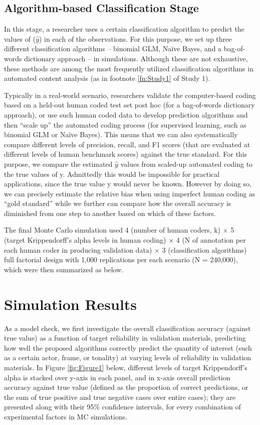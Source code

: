 \documentclass[man, 12pt, a4paper, nolmodern, noextraspace]{apa6}
\begin{document}
    \subsection{Algorithm-based Classification Stage}
    
    In this stage, a researcher uses a certain classification algorithm to predict the values of ($\hat{y}$) in each of the observations. For this purpose, we set up three different classification algorithms – binomial GLM, Naïve Bayes, and a bag-of-words dictionary approach -- in simulations. Although these are not exhaustive, these methods are among the most frequently utilized classification algorithms in automated content analysis (as in footnote \ref{fn:Study1} of Study 1). 
    
    Typically in a real-world scenario, researchers validate the computer-based coding based on a held-out human coded test set post hoc (for a bag-of-words dictionary approach), or use such human coded data to develop prediction algorithms and then ``scale up'' the automated coding process (for supervised learning, such as binomial GLM or Naïve Bayes). This means that we can also systematically compare different levels of precision, recall, and F1 scores (that are evaluated at different levels of human benchmark scores) against the true standard. For this purpose, we compare the estimated $\hat{y}$ values from scaled-up automated coding to the true values of y. Admittedly this would be impossible for practical applications, since the true value y would never be known. However by doing so, we can precisely estimate the relative bias when using imperfect human coding as \enquote{gold standard} while we further can compare how the overall accuracy is diminished from one step to another based on which of these factors. 
    
    The final Monte Carlo simulation used 4 (number of human coders, k) $\times$ 5 (target Krippendorff's alpha levels in human coding) $\times$ 4 (N of annotation per each human coder in producing validation data) $\times$ 3 (classification algorithms) full factorial design with 1,000 replications per each scenario (N = 240,000), which were then summarized as below.
    
\section{Simulation Results}

As a model check, we first investigate the overall classification accuracy (against true value) as a function of target reliability in validation materials, predicting how well the proposed algorithms correctly predict the quantity of interest (such as a certain actor, frame, or tonality) at varying levels of reliability in validation materials. In Figure \ref{fig:Figure1} below, different levels of target Krippendorff's alpha is stacked over y-axis in each panel, and in x-axis overall prediction accuracy against true value (defined as the proportion of correct predictions, or the sum of true positive and true negative cases over entire cases); they are presented along with their 95\% confidence intervals, for every combination of experimental factors in MC simulations.
\end{document}
